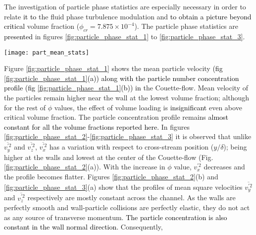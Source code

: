 \documentclass[notitlepage]{revtex4-1}
\begin{document}
The investigation of particle phase statistics are especially necessary in order to relate \textcolor{black}{it to} the fluid phase turbulence modulation and \textcolor{black}{to obtain a picture beyond critical} volume fraction ($\phi_{cr}=7.875\times10^{-4}$). The particle phase statistics are \textcolor{black}{presented} in figures \ref{fig:particle_phase_stat_1} to \ref{fig:particle_phase_stat_3}.
		\begin{figure*}[!]
			\texttt{[image: part\_mean\_stats]}
			\caption{Effect of particle volume fraction on (a) mean velocity, and (b) particle number concentration } 
			\label{fig:particle_phase_stat_1}
		\end{figure*} 
 Figure \ref{fig:particle_phase_stat_1} shows the mean particle velocity \textcolor{black}{(fig \ref{fig:particle_phase_stat_1}(a)) along with the particle number concentration profile (fig \ref{fig:particle_phase_stat_1}(b)) in} the Couette-flow. Mean velocity of the particles remain higher near the wall at the lowest volume fraction; although for the rest of $\phi$ values, the effect of volume loading is \textcolor{black}{insignificant} even above critical volume fraction. The particle concentration profile remains \textcolor{black}{almost constant for all the volume fractions reported here.} 
 In figures \ref{fig:particle_phase_stat_2}-\ref{fig:particle_phase_stat_3} it is observed that unlike $\overline{v_y^{\prime 2}}$ and $\overline{v_z^{\prime 2}}$, $\overline{v_x^{\prime 2}}$ has a variation with respect to cross-stream position ($y/\delta$); being higher at the walls and lowest at the center of the Couette-flow (Fig. \ref{fig:particle_phase_stat_2}(a)). With the increase in $\phi$ value, $v_x^{\prime 2}$ decreases and the profile becomes flatter. Figures \ref{fig:particle_phase_stat_2}(b) and \ref{fig:particle_phase_stat_3}(a) show that the profiles of mean square velocities $\overline{v_y^{\prime 2}}$ and $\overline{v_z^{\prime 2}}$ respectively are mostly constant across the channel. As the walls are perfectly smooth and wall-particle collisions are perfectly elastic, they do not act as any source of transverse momentum. \textcolor{black}{The particle concentration is also constant in the wall normal direction.} Consequently, 
\end{document}
